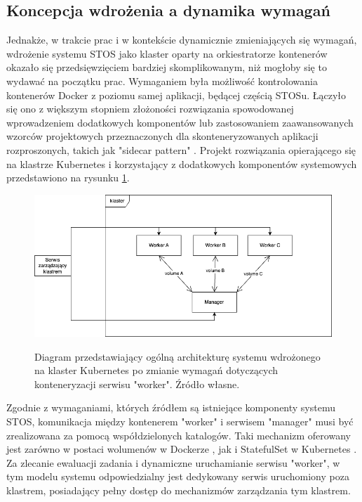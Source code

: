 \subsection{Koncepcja wdrożenia a dynamika wymagań}
Jednakże, w trakcie prac i w kontekście dynamicznie zmieniających się wymagań, wdrożenie systemu STOS jako klaster oparty na orkiestratorze kontenerów okazało się przedsięwzięciem bardziej skomplikowanym, niż mogłoby się to wydawać na początku prac. Wymaganiem była możliwość kontrolowania kontenerów Docker z poziomu samej aplikacji, będącej częścią STOSu. Łączyło się ono z większym stopniem złożoności rozwiązania spowodowanej wprowadzeniem dodatkowych komponentów lub zastosowaniem zaawansowanych wzorców projektowych przeznaczonych dla skonteneryzowanych aplikacji rozproszonych, takich jak "sidecar pattern" \cite{k8sPatterns}. Projekt rozwiązania opierającego się na klastrze Kubernetes i korzystający z dodatkowych komponentów systemowych przedstawiono na rysunku \ref{diagramk8sFinal}.

\begin{figure}[!h]
	\begin{center}
		\resizebox{0.7\textwidth}{!} {
			\includegraphics{img/4/k8sFinal.png}
		}
		\caption[Diagram prototypu klastra Kubernetes po zmianie architektury]{Diagram przedstawiający ogólną architekturę systemu wdrożonego na klaster Kubernetes po zmianie wymagań dotyczących konteneryzacji serwisu "worker". Źródło własne.}
		\label{diagramk8sFinal}
	\end{center}
\end{figure}

Zgodnie z wymaganiami, których źródłem są istniejące komponenty systemu STOS, komunikacja między kontenerem "worker" i serwisem "manager" musi być zrealizowana za pomocą współdzielonych katalogów. Taki mechanizm oferowany jest zarówno w postaci wolumenów w Dockerze \cite{dockerVolume}, jak i StatefulSet w Kubernetes \cite{k8sStateful}. Za zlecanie ewaluacji zadania i dynamiczne uruchamianie serwisu "worker", w tym modelu systemu odpowiedzialny jest dedykowany serwis uruchomiony poza klastrem, posiadający pełny dostęp do mechanizmów zarządzania tym klastrem.


